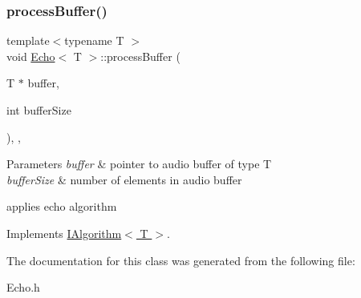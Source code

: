 \subsubsection{\texorpdfstring{process\+Buffer()}{processBuffer()}}
{\footnotesize\ttfamily template$<$typename T $>$ \\
void \hyperlink{classEcho}{Echo}$<$ T $>$\+::process\+Buffer (\begin{DoxyParamCaption}\item[{T $\ast$}]{buffer,  }\item[{int}]{buffer\+Size }\end{DoxyParamCaption})\hspace{0.3cm}{\ttfamily [inline]}, {\ttfamily [override]}, {\ttfamily [virtual]}}


\begin{DoxyParams}{Parameters}
{\em buffer} & pointer to audio buffer of type T \\
\hline
{\em buffer\+Size} & number of elements in audio buffer\\
\hline
\end{DoxyParams}
applies echo algorithm 

Implements \hyperlink{classIAlgorithm}{I\+Algorithm$<$ T $>$}.



The documentation for this class was generated from the following file\+:\begin{DoxyCompactItemize}
\item 
Echo.\+h\end{DoxyCompactItemize}
